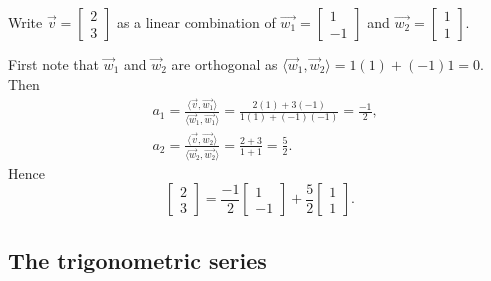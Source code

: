 \documentclass[12pt]{book}
\begin{document}
\begin{example}
Write
$\vec{v} = \left[ \begin{smallmatrix} 2 \\ 3 \end{smallmatrix} \right]$
as a linear combination of 
$\vec{w_1} = \left[ \begin{smallmatrix} 1 \\ -1 \end{smallmatrix} \right]$
and
$\vec{w_2} = \left[ \begin{smallmatrix} 1 \\ 1 \end{smallmatrix} \right]$.

First note that $\vec{w}_1$ and $\vec{w}_2$ are orthogonal
as $\langle \vec{w}_1 , \vec{w}_2 \rangle = 1(1) + (-1)1 = 0$.
Then
\begin{align*}
& a_1 = 
\frac{\langle \vec{v} , \vec{w_1} \rangle}{
\langle \vec{w}_1 , \vec{w_1} \rangle}
=
\frac{2(1) + 3(-1)}{1(1) + (-1)(-1)} = \frac{-1}{2} ,
\\
& a_2 = 
\frac{\langle \vec{v} , \vec{w_2} \rangle}{
\langle \vec{w}_2 , \vec{w_2} \rangle}
=
\frac{2 + 3}{1 + 1} = \frac{5}{2} .
\end{align*}
Hence
\begin{equation*}
\begin{bmatrix} 2 \\ 3 \end{bmatrix}
=
\frac{-1}{2}
\begin{bmatrix} 1 \\ -1 \end{bmatrix}
+
\frac{5}{2}
\begin{bmatrix} 1 \\ 1 \end{bmatrix} .
\end{equation*}
\end{example}

\subsection{The trigonometric series}
\end{document}
